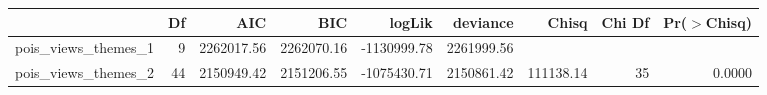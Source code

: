 \begin{table}[ht]
\centering
\begin{tabular}{lrrrrrrrr}
  \hline
 & Df & AIC & BIC & logLik & deviance & Chisq & Chi Df & Pr($>$Chisq) \\ 
  \hline
pois\_views\_themes\_1 & 9 & 2262017.56 & 2262070.16 & -1130999.78 & 2261999.56 &  &  &  \\ 
  pois\_views\_themes\_2 & 44 & 2150949.42 & 2151206.55 & -1075430.71 & 2150861.42 & 111138.14 & 35 & 0.0000 \\ 
   \hline
\end{tabular}
\end{table}
